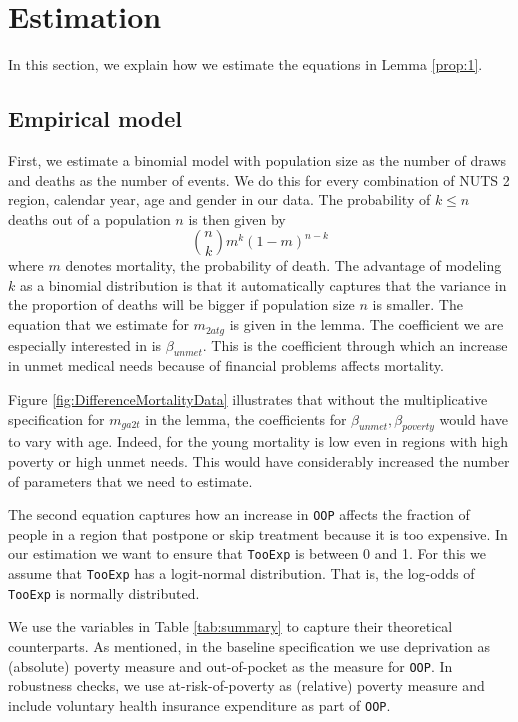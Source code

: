\documentclass[a4paper,12pt]{article}
\begin{document}
\section{Estimation}
\label{sec:org67a9be0}
\label{sec:estimation}

In this section, we explain how we estimate the equations in Lemma \ref{prop:1}.

\subsection{Empirical model}
\label{sec:orge9386c2}

First, we estimate a binomial model with population size as the number of draws and deaths as the number of events. We do this for every combination of NUTS 2 region, calendar year, age and gender in our data. The probability of \(k \leq n\) deaths out of a population \(n\) is then given by
\begin{equation}
\label{eq:binomial}
\binom{n}{k} m^{k}(1-m)^{n-k}
\end{equation}
where \(m\) denotes mortality, the probability of death. The advantage of modeling \(k\) as a binomial distribution is that it automatically captures that the variance in the proportion of deaths will be bigger if population size \(n\) is smaller. The equation that we estimate for \(m_{2atg}\) is given in the lemma. The coefficient we are especially interested in is \(\beta_{unmet}\). This is the coefficient through which an increase in unmet medical needs because of financial problems affects mortality.

Figure \ref{fig:DifferenceMortalityData} illustrates that without the multiplicative specification for \(m_{ga2t}\) in the lemma, the coefficients for \(\beta_{unmet}, \beta_{poverty}\) would have to vary with age. Indeed, for the young mortality is low even in regions with high poverty or high unmet needs. This would have considerably increased the number of parameters that we need to estimate. 

The second equation captures how an increase in \texttt{OOP} affects the fraction of people in a region that postpone or skip treatment because it is too expensive. In our estimation we want to ensure that \texttt{TooExp} is between 0 and 1. For this we assume that \texttt{TooExp} has a logit-normal distribution. That is, the log-odds of \texttt{TooExp} is normally distributed.

We use the variables in Table \ref{tab:summary} to capture their theoretical counterparts. As mentioned, in the baseline specification we use deprivation as (absolute) poverty measure and out-of-pocket as the measure for \texttt{OOP}. In robustness checks, we use at-risk-of-poverty as (relative) poverty measure and include voluntary health insurance expenditure as part of \texttt{OOP}.
\end{document}
